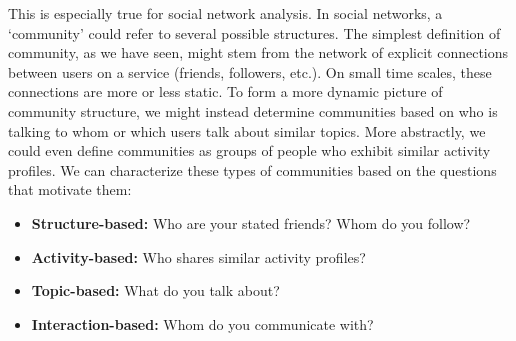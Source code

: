 \documentclass[10pt,letterpaper]{article}
\begin{document}
This is especially true for social network analysis. In social networks, a `community' could refer to several possible structures. The simplest definition of community, as we have seen, might stem from the network of explicit connections between users on a service (friends, followers, etc.). On small time scales, these connections are more or less static. To form a more dynamic picture of community structure, we might instead determine communities based on who is talking to whom or which users talk about similar topics.
More abstractly, we could even define communities as groups of people who exhibit similar activity profiles. We can characterize these types of communities based on the questions that motivate them:
\begin{itemize}
	\item \textbf{Structure-based:} Who are your stated friends? Whom do you follow?
	\item \textbf{Activity-based:} Who shares similar activity profiles?
	\item \textbf{Topic-based:} What do you talk about?
	\item \textbf{Interaction-based:} Whom do you communicate with?
\end{itemize}
\end{document}
